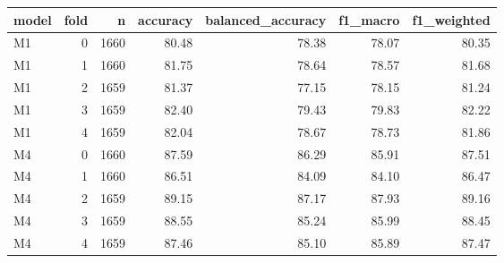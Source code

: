 \begin{tabular}{lrrrrrr}
\toprule
model & fold & n & accuracy & balanced\_accuracy & f1\_macro & f1\_weighted \\
\midrule
M1 & 0 & 1660 & 80.48 & 78.38 & 78.07 & 80.35 \\
M1 & 1 & 1660 & 81.75 & 78.64 & 78.57 & 81.68 \\
M1 & 2 & 1659 & 81.37 & 77.15 & 78.15 & 81.24 \\
M1 & 3 & 1659 & 82.40 & 79.43 & 79.83 & 82.22 \\
M1 & 4 & 1659 & 82.04 & 78.67 & 78.73 & 81.86 \\
M4 & 0 & 1660 & 87.59 & 86.29 & 85.91 & 87.51 \\
M4 & 1 & 1660 & 86.51 & 84.09 & 84.10 & 86.47 \\
M4 & 2 & 1659 & 89.15 & 87.17 & 87.93 & 89.16 \\
M4 & 3 & 1659 & 88.55 & 85.24 & 85.99 & 88.45 \\
M4 & 4 & 1659 & 87.46 & 85.10 & 85.89 & 87.47 \\
\bottomrule
\end{tabular}
